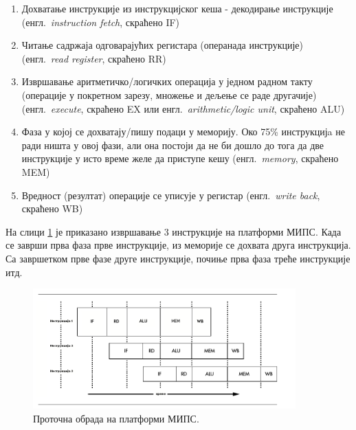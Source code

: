 \documentclass[12pt,oneside]{memoir}
\begin{document}
\begin{enumerate}
\item Дохватање инструкције из инструкцијског кеша - декодирање инструкције (енгл.~\textit{instruction fetch}, скраћено IF)
\item Читање садржаја одговарајућих регистара (операнада инструкције) (енгл.~\textit{read register}, скраћено RR)
\item Извршавање аритметичко/логичких операција у једном радном такту (операције у покретном зарезу, множење и дељење се раде другачије) (енгл.~\textit{execute}, скраћено EX или енгл.~\textit{ari\-thmetic/logic unit}, скраћено ALU)
\item  Фаза у којој се дохватају/пишу подаци у меморију. Око 75\% инструкцијa не ради ништа у овој фази, али она постоји да не би дошло до тога да две инструкције у исто време желе да приступе кешу (енгл.~\textit{memory}, скраћено MEM)
\item Вредност (резултат) операције се уписује у регистар (енгл.~\textit{write back}, скраћено WB)
\end{enumerate}

На слици \ref{fig:pipeline} је приказано извршавање 3 инструкције на платформи МИПС. Када се заврши прва фаза прве инструкције, из меморије се дохвата друга инструкција. Са завршетком прве фазе друге инструкције, почиње прва фаза треће инструкције итд. 

\begin{figure}[!ht]
  \centering
  \includegraphics[width=0.9\textwidth]{pipeline.png}
  \caption{Проточна обрада на платформи МИПС.}
  \label{fig:pipeline}
\end{figure}
\end{document}
